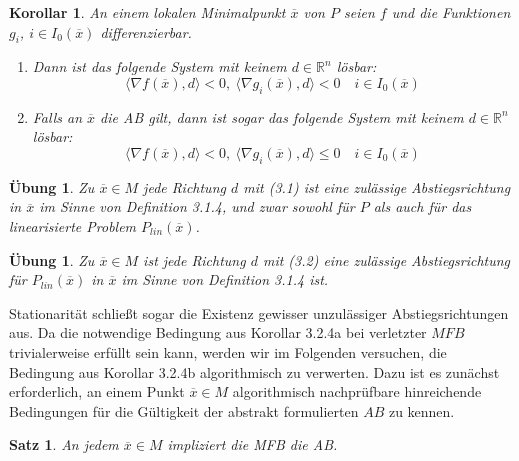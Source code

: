 \documentclass[11pt]{scrreprt}
\newcounter{thm}
\theoremstyle{thmstyle}
\numberwithin{thm}{section}
\newtheorem{korollar}[thm]{Korollar}
\newtheorem{satz}[thm]{Satz}
\newtheorem{uebung}[thm]{Übung}
\begin{document}
\begin{korollar}
	An einem lokalen Minimalpunkt $\overline{x}$ von $P$ seien $f$ und die Funktionen $g_i$, $i \in I_0(\overline{x})$ differenzierbar.
	\begin{enumerate}[label=\alph*\upshape)]
		\item Dann ist das folgende System mit keinem $d \in \mathbb{R}^n$ lösbar:
			\begin{equation}
				\langle \nabla f(\overline{x}), d \rangle < 0, ~\langle \nabla g_i(\overline{x}), d \rangle < 0 \quad i \in I_0(\overline{x}) \tag*{(3.1)}
			\end{equation} 
		\item Falls an $\overline{x}$ die AB gilt, dann ist sogar das folgende System mit keinem $d \in \mathbb{R}^n$ lösbar:
			\begin{equation}
				\langle \nabla f(\overline{x}), d \rangle < 0, ~ \langle \nabla g_i(\overline{x}), d \rangle \leq 0 \quad i \in I_0(\overline{x}) \tag*{(3.2)}
			\end{equation} 
	\end{enumerate}
\end{korollar}

\begin{uebung}
	Zu $\overline{x} \in M$ jede Richtung $d$ mit (3.1) ist eine zulässige Abstiegsrichtung in $\overline{x}$ im Sinne von Definition 3.1.4, und zwar sowohl für $P$ als auch für das linearisierte Problem $P_{lin}(\overline{x})$.
\end{uebung}

\begin{uebung}
	Zu $\overline{x} \in M$ ist jede Richtung $d$ mit (3.2) eine zulässige Abstiegsrichtung für $P_{lin}(\overline{x})$ in $\overline{x}$ im Sinne von Definition 3.1.4 ist.
\end{uebung}
 
 Stationarität schließt sogar die Existenz gewisser unzulässiger Abstiegsrichtungen aus. Da die notwendige Bedingung aus Korollar 3.2.4a bei verletzter $MFB$ trivialerweise erfüllt sein kann, werden wir im Folgenden versuchen, die Bedingung aus Korollar 3.2.4b algorithmisch zu verwerten. Dazu ist es zunächst erforderlich, an einem Punkt $\overline{x} \in M$ algorithmisch nachprüfbare hinreichende Bedingungen für die Gültigkeit der abstrakt formulierten $AB$ zu kennen.
 
\setcounter{thm}{7}

\begin{satz}
	An jedem $\overline{x} \in M$ impliziert die MFB die AB.	
\end{satz}
\end{document}
